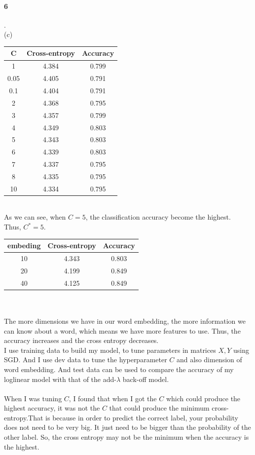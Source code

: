 \documentclass[11pt]{article}
\begin{document}
\paragraph{6}.\\
(c)\\
\begin{tabular}{|c|c|c|} 
\hline 
C&Cross-entropy&Accuracy\\
\hline  
1&4.384&0.799\\
\hline
0.05&4.405&0.791\\
\hline
0.1&4.404&0.791\\
\hline
2&4.368&0.795\\
\hline
3&4.357&0.799\\
\hline
4&4.349&0.803\\
\hline
5&4.343&0.803\\
\hline
6&4.339&0.803\\
\hline
7&4.337&0.795\\
\hline
8&4.335&0.795\\
\hline
10&4.334&0.795\\
\hline
\end{tabular}\\
As we can see, when $C=5$, the classification accuracy become the highest.\\ 
Thus, $C^*=5$.\\
\begin{tabular}{|c|c|c|} 
\hline 
embeding&Cross-entropy&Accuracy\\
\hline  
10&4.343&0.803\\
\hline
20&4.199&0.849\\
\hline
40&4.125&0.849\\
\hline
\end{tabular}\\
\\
The more dimensions we have in our word embedding, the more information we can know about a word, which means we have more features to use. Thus, the accuracy increases and the cross entropy decreases.\\
I use training data to build my model, to tune parameters in matrices $X,Y$ using SGD. And I use dev data to tune the hyperparameter $C$ and also dimension of word embedding. And test data can be used to compare the accuracy of my loglinear model with that of the add-$\lambda$ back-off model.\\
\\
When I was tuning $C$, I found that when I got the $C$ which could produce the highest accuracy, it was not the $C$ that could produce the minimum cross-entropy.That is because in order to predict the correct label, your probability does not need to be very big. It just need to be bigger than the probability of the other label. So, the cross entropy may not be the minimum when the accuracy is the highest.\\
\end{document}
